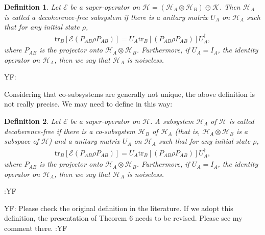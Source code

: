 \documentclass[journal]{IEEEtran}
\def\h{\ensuremath{\mathcal{H}}}
\def\k{\ensuremath{\mathcal{K}}}
\def\e{\ensuremath{\mathcal{E}}}
\def\k{\mathcal{K}}
\newtheorem{definition}{Definition}
\newcommand{\authorComment}[3]{\color{#1}#2: {#3} :#2\color{black}}
\newcommand{\yf}[1]{\authorComment{blue}{YF}{#1}}
\begin{document}
\begin{definition}\label{eq_dfs_def}
   Let $\e$ be a super-operator on $\h=(\h_A\otimes\h_B)\oplus\k $. Then
   $\h_A$ is called a decoherence-free subsystem if there is a unitary matrix $U_A$ on $\h_A$ such that for any initial state $\rho$,\begin{eqnarray}\label{Eq_def_U}
     \textrm{tr}_{B}[\e(P_{AB}\rho P_{AB})]=U_A\textrm{tr}_{B}[(P_{AB}\rho P_{AB})]U_A^\dagger,
   \end{eqnarray}
   where $P_{AB}$ is the projector onto $\h_A\otimes \h_B$. 
  Furthermore, if $U_A=I_A$, the identity operator on $\h_A$, then we say that $\h_A$ is noiseless.  
\end{definition}

\yf{Considering that co-subsystems are generally not unique, the above definition is not really precise. We may need to define in this way:
\begin{definition}\label{eq_dfs_def}
   Let $\e$ be a super-operator on $\h$. A subsystem 
   $\h_A$ of $\h$ is called decoherence-free if there is a co-subsystem $\h_B$ of $\h_A$ (that is, $\h_A\otimes\h_B$ is a subspace of $\h$) and a unitary matrix $U_A$ on $\h_A$ such that for any initial state $\rho$,\begin{eqnarray}\label{Eq_def_U}
     \textrm{tr}_{B}[\e(P_{AB}\rho P_{AB})]=U_A\textrm{tr}_{B}[(P_{AB}\rho P_{AB})]U_A^\dagger,
   \end{eqnarray}
   where $P_{AB}$ is the projector onto $\h_A\otimes \h_B$. 
  Furthermore, if $U_A=I_A$, the identity operator on $\h_A$, then we say that $\h_A$ is noiseless.  
\end{definition}
}

\yf{Please check the original definition in the literature. If we adopt this definition, the presentation of Theorem 6 needs to be revised. Please see my comment there.}

\end{document}
